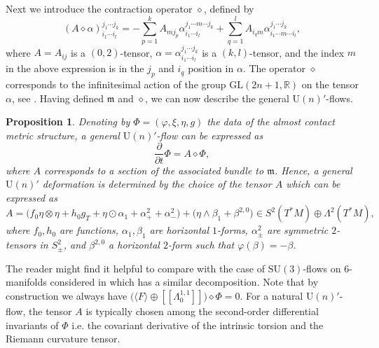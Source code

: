 \documentclass{article}
\newtheorem{prop}[thm]{Proposition}
\theoremstyle{definition}
\newcommand{\R}{\mathbb{R}}
\newcommand{\SU}{\mathrm{SU}}
\newcommand{\w}{\wedge}
\numberwithin{equation}{section}
\begin{document}
Next we introduce the contraction operator $\diamond$, defined by
\[
(A \diamond \alpha)_{i_1\cdots i_l}^{j_1\cdots j_k}= -\sum_{p=1}^kA_{m j_p} \alpha^{j_1\cdots m \cdots j_k}_{i_1\cdots i_l}+\sum_{q=1}^lA_{i_q m}\alpha^{j_1\cdots j_k}_{i_1\cdots m\cdots i_l },
\]
where $A=A_{ij}$ is a $(0,2)$-tensor, $\alpha=\alpha_{i_1\cdots i_l}^{j_1 \cdots j_k}$ is a $(k,l)$-tensor, and the index $m$ in the above expression is in the $j_p$ and $i_q$ position in $\alpha$. The operator $\diamond$ corresponds to the infinitesimal action of the group $\mathrm{GL}(2n+1,\R)$ on the tensor $\alpha$, see \cite{Fadel2022}.
Having defined $\mathfrak{m}$ and $\diamond$, we can now describe the general $\mathrm{U}(n)'$-flows.
\begin{prop}
Denoting by $\Phi=(\varphi,\xi,\eta,g)$ the data of the almost contact metric structure, a general $\mathrm{U}(n)'$-flow can be expressed as
\begin{equation}\label{equ: general flow A}
    \frac{\partial}{\partial t} \Phi = A \diamond \Phi,
\end{equation}
where $A$ corresponds to a section of the associated bundle to $\mathfrak{m}$. Hence, a general $\mathrm{U}(n)'$ deformation is determined by the choice of the tensor $A$ which can be expressed as
\begin{equation}
    A = \Big(f_0 \eta \otimes \eta + h_0 g_T + \eta \odot \alpha_1 + \alpha^2_+ +\alpha^2_-\Big)+ \Big(\eta \w \beta_1 +\beta^{2,0}\Big) \in  S^2(T^*M)\oplus\Lambda^2(T^*M),\label{eq: general A}
\end{equation}
where $f_0,h_0$ are functions, $\alpha_1,\beta_1$ are horizontal $1$-forms, $\alpha^2_\pm$ are symmetric $2$-tensors in $S^2_{\pm}$, and $\beta^{2,0}$ a horizontal $2$-form such that $\varphi(\beta)=-\beta$.    
\end{prop}
The reader might find it helpful to compare  with the case of $\SU(3)$-flows on $6$-manifolds considered in \cite{fadelflows2} which has a similar decomposition. Note that by construction we always have $\big(\langle F\rangle\oplus [\![\Lambda^{1,1}_0]\!]\big) \diamond \Phi=0$. For a natural $\mathrm{U}(n)'$-flow, the tensor $A$ is typically chosen among the second-order differential invariants of $\Phi$ i.e. the covariant derivative of the intrinsic torsion and the Riemann curvature tensor.
\end{document}
